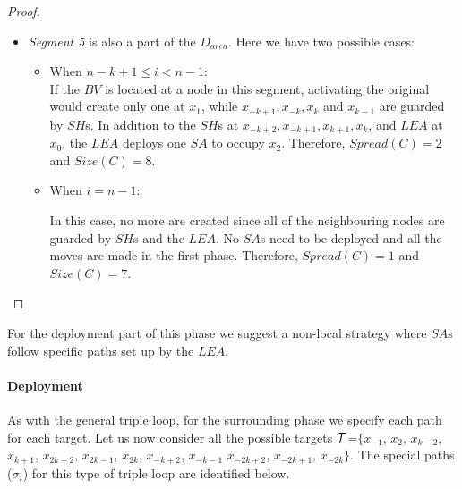 \begin{proof}
\begin{itemize}
\item  {\em Segment 5}  is also a part of the $D_{area}$. Here we have two possible cases:

\begin{itemize}
\item When $n-k+1 \leq i < n-1$:\\ 

If the $BV$ is located at a node in this segment, activating the original \bv would create only one \bv at $x_{1}$, while $x_{-k+1},x_{-k},x_{k}$ and $x_{k-1}$ are guarded by $SH$s. In addition to the $SH$s at $x_{-k+2},x_{-k+1},x_{k+1},x_{k}$, and $LEA$ at $x_{0}$, the $LEA$ deploys one  $SA$ to occupy $x_{2}$. Therefore, $Spread(C)=2$ and $Size(C)=8$.  \\ 

\item  When $i=n-1$: %
 
In this case, no more \bvs are created since all of the neighbouring nodes are guarded by $SH$s and the $LEA$. No $SA$s need to be deployed and all the moves are made in the first phase. Therefore, $Spread(C)=1$ and $Size(C)=7$.  \\ 

\end{itemize}
\end{itemize}
\end{proof}





For the deployment part of this phase we suggest   a non-local strategy where $SA$s follow  specific paths set up by the $LEA$.


\paragraph{Deployment}



As with the general triple loop, for the surrounding phase  we specify each path for each target. Let us now consider all the possible targets ${\cal T}$=$\{x_{-1}$, $ x_{2}$,  $x_{k-2}$, $x_{k+1}$, $x_{2k-2}$, $x_{2k-1}$, $x_{2k}$, $x_{-k+2}$, $x_{-k-1}$  $x_{-2k+2}$, $x_{-2k+1}$, $x_{-2k}\}$.  The  special paths ($\sigma_i$) for this type of triple loop are identified below. 


